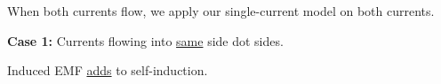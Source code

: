 \begin{multicols}{2}
\begin{CheatsheetEntryFrame}


    \end{CheatsheetEntryFrame}


    \begin{CheatsheetEntryFrame}


        When both currents flow, we apply our single-current model on both currents.

        \bigskip

        \textbf{Case 1:} Currents flowing into \ul{same} side dot sides.

         Induced EMF \ul{adds} to self-induction.

        \medskip


\end{CheatsheetEntryFrame}
\end{multicols}
